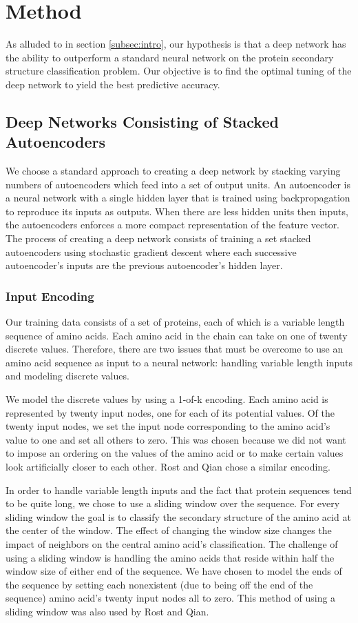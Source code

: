 \documentclass[]{article}
\begin{document}
\section{Method}
As alluded to in section \ref{subsec:intro}, our hypothesis is that a deep network has the ability to outperform a standard neural network on the protein secondary structure classification
problem.
Our objective is to find the optimal tuning of the deep network to yield the best predictive accuracy.

\subsection{Deep Networks Consisting of Stacked Autoencoders}
We choose a standard approach to creating a deep network by stacking varying numbers of autoencoders \cite{Hinton} which feed into a set of output units.
An autoencoder is a neural network with a single hidden layer that is trained using backpropagation to reproduce its inputs as outputs.
When there are less hidden units then inputs, the autoencoders enforces a more compact representation of the feature vector.
The process of creating a deep network consists of training a set stacked autoencoders using stochastic gradient descent where each successive autoencoder's inputs are the previous autoencoder's hidden layer.

\subsubsection{Input Encoding}
Our training data consists of a set of proteins, each of which is a variable length sequence of amino acids.
Each amino acid in the chain can take on one of twenty discrete values.
Therefore, there are two issues that must be overcome to use an amino acid sequence as input to a neural network: handling variable length inputs and modeling discrete values.

We model the discrete values by using a 1-of-k encoding.
Each amino acid is represented by twenty input nodes, one for each of its potential values.
Of the twenty input nodes, we set the input node corresponding to the amino acid's value to one and set all others to zero.
This was chosen because we did not want to impose an ordering on the values of the amino acid or to make certain values look artificially closer to each other.
Rost and Qian chose a similar encoding.

In order to handle variable length inputs and the fact that protein sequences tend to be quite long, we chose to use a sliding window over the sequence.
For every sliding window the goal is to classify the secondary structure of the amino acid at the center of the window.
The effect of changing the window size changes the impact of neighbors on the central amino acid's classification.
The challenge of using a sliding window is handling the amino acids that reside within half the window size of either end of the sequence.
We have chosen to model the ends of the sequence by setting each nonexistent (due to being off the end of the sequence) amino acid's twenty input nodes all to zero.
This method of using a sliding window was also used by Rost and Qian.
\end{document}

